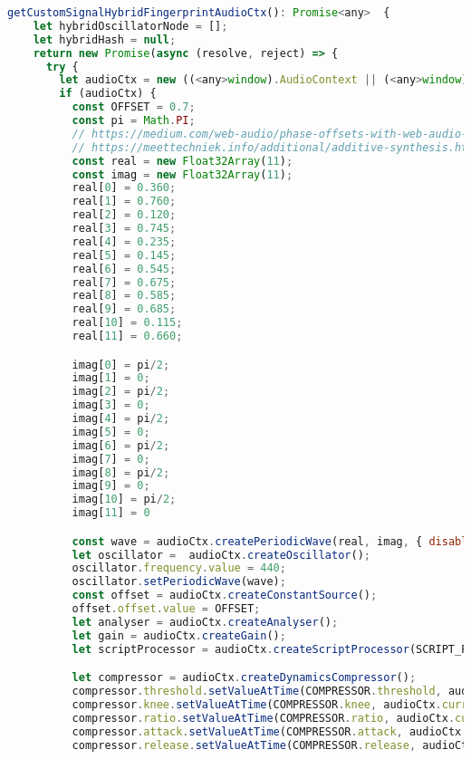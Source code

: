 \begin{lstlisting}[language=JavaScript, caption=Custom Signal Hybrid fingerprint generation code, label=customSignalHybridFingerprintGenerationCode]
  getCustomSignalHybridFingerprintAudioCtx(): Promise<any>  {
    let hybridOscillatorNode = [];
    let hybridHash = null;
    return new Promise(async (resolve, reject) => {
      try {
        let audioCtx = new ((<any>window).AudioContext || (<any>window).webkitAudioContext)();
        if (audioCtx) {
          const OFFSET = 0.7;
          const pi = Math.PI;
          // https://medium.com/web-audio/phase-offsets-with-web-audio-wavetables-c7dc85ac3218
          // https://meettechniek.info/additional/additive-synthesis.html
          const real = new Float32Array(11);
          const imag = new Float32Array(11);
          real[0] = 0.360;
          real[1] = 0.760;
          real[2] = 0.120;
          real[3] = 0.745;
          real[4] = 0.235;
          real[5] = 0.145;
          real[6] = 0.545;
          real[7] = 0.675;
          real[8] = 0.585;
          real[9] = 0.685;
          real[10] = 0.115;
          real[11] = 0.660;

          imag[0] = pi/2;
          imag[1] = 0;
          imag[2] = pi/2;
          imag[3] = 0;
          imag[4] = pi/2;
          imag[5] = 0;
          imag[6] = pi/2;
          imag[7] = 0;
          imag[8] = pi/2;
          imag[9] = 0;
          imag[10] = pi/2;
          imag[11] = 0

          const wave = audioCtx.createPeriodicWave(real, imag, { disableNormalization: true });
          let oscillator =  audioCtx.createOscillator();
          oscillator.frequency.value = 440;
          oscillator.setPeriodicWave(wave);
          const offset = audioCtx.createConstantSource();
          offset.offset.value = OFFSET;
          let analyser = audioCtx.createAnalyser();
          let gain = audioCtx.createGain();
          let scriptProcessor = audioCtx.createScriptProcessor(SCRIPT_PROCESSOR.bufferSize, SCRIPT_PROCESSOR.numberOfInputChannels, SCRIPT_PROCESSOR.numberOfOutputChannels);

          let compressor = audioCtx.createDynamicsCompressor();
          compressor.threshold.setValueAtTime(COMPRESSOR.threshold, audioCtx.currentTime);
          compressor.knee.setValueAtTime(COMPRESSOR.knee, audioCtx.currentTime);
          compressor.ratio.setValueAtTime(COMPRESSOR.ratio, audioCtx.currentTime);
          compressor.attack.setValueAtTime(COMPRESSOR.attack, audioCtx.currentTime);
          compressor.release.setValueAtTime(COMPRESSOR.release, audioCtx.currentTime);


\end{lstlisting}
